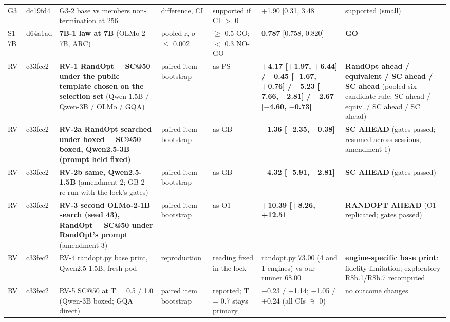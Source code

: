 \begin{longtable}{p{1.2cm}p{1.3cm}p{3.8cm}p{2.1cm}p{2.1cm}p{2.4cm}p{2.7cm}}
G3 & dc19fd4 & G3-2 base vs members non-termination at 256 & difference, CI & supported if CI $>$ 0 & +1.90 [0.31, 3.48] & supported (small) \\
S1-7B & d64a1ad & \textbf{7B-1 law at 7B} (OLMo-2-7B, ARC) & pooled r, $\sigma$ $\le$ 0.002 & $\ge$ 0.5 GO; $<$ 0.3 NO-GO & \textbf{0.787} [0.758, 0.820] & \textbf{GO} \\
RV & c33fec2 & \textbf{RV-1 RandOpt $-$ SC@50 under the public template chosen on the selection set} (Qwen-1.5B / Qwen-3B / OLMo / GQA) & paired item bootstrap & as PS & \textbf{+4.17 [+1.97, +6.44] / $-$0.45 [$-$1.67, +0.76] / $-$5.23 [$-$7.66, $-$2.81] / $-$2.67 [$-$4.60, $-$0.73]} & \textbf{RandOpt ahead / equivalent / SC ahead / SC ahead} (pooled six-candidate rule: SC ahead / equiv. / SC ahead / SC ahead) \\
RV & c33fec2 & \textbf{RV-2a RandOpt searched under boxed $-$ SC@50 boxed, Qwen2.5-3B (prompt held fixed)} & paired item bootstrap & as GB & \textbf{$-$1.36 [$-$2.35, $-$0.38]} & \textbf{SC AHEAD} (gates passed; resumed across sessions, amendment 1) \\
RV & c33fec2 & \textbf{RV-2b same, Qwen2.5-1.5B} (amendment 2; GB-2 re-run with the lock's gates) & paired item bootstrap & as GB & \textbf{$-$4.32 [$-$5.91, $-$2.81]} & \textbf{SC AHEAD} (gates passed) \\
RV & c33fec2 & \textbf{RV-3 second OLMo-2-1B search (seed 43), RandOpt $-$ SC@50 under RandOpt's prompt} (amendment 3) & paired item bootstrap & as O1 & \textbf{+10.39 [+8.26, +12.51]} & \textbf{RANDOPT AHEAD} (O1 replicated; gates passed) \\
RV & c33fec2 & RV-4 randopt.py base print, Qwen2.5-1.5B, fresh pod & reproduction & reading fixed in the lock & randopt.py 73.00 (4 and 1 engines) vs our runner 68.00 & \textbf{engine-specific base print}: fidelity limitation; exploratory R8b.1/R8b.7 recomputed \\
RV & c33fec2 & RV-5 SC@50 at T = 0.5 / 1.0 (Qwen-3B boxed; GQA direct) & paired item bootstrap & reported; T = 0.7 stays primary & $-$0.23 / $-$1.14; $-$1.05 / +0.24 (all CIs $\ni$ 0) & no outcome changes \\
\bottomrule
\end{longtable}
